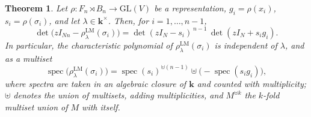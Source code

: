 \documentclass[11pt]{article}
\newtheorem{theorem}{Theorem}[section]
\theoremstyle{definition}
\theoremstyle{remark}
\newcommand{\GL}{\mathrm{GL}}
\newcommand{\spec}{\operatorname{spec}}
\newcommand{\kk}{\boldsymbol{k}}
\newcommand{\rLMl}{\rho^{\mathrm{LM}}_{\lambda}}
\begin{document}
\begin{theorem}\label{thm:charpoly}
Let $\rho \colon F_n \rtimes B_n \to \GL(V)$ be a representation,
$g_i = \rho(x_i)$, $s_i = \rho(\sigma_i)$, and let
$\lambda \in \kk^{\times}$. Then, for $i = 1, \dots, n-1$,
\begin{equation}\label{eq:charpoly}
\det\bigl(z I_{Nn} - \rLMl(\sigma_i)\bigr)
= \det(z I_N - s_i)^{\,n-1}\,\det(z I_N + s_i g_i).
\end{equation}
In particular, the characteristic polynomial of $\rLMl(\sigma_i)$ is
independent of $\lambda$, and as a multiset
\begin{equation}\label{eq:multiset}
\spec\bigl(\rLMl(\sigma_i)\bigr)
= \spec(s_i)^{\uplus (n-1)} \uplus
\bigl(-\spec(s_i g_i)\bigr),
\end{equation}
where spectra are taken in an algebraic closure of $\kk$ and counted with
multiplicity; $\uplus$ denotes the union of multisets, adding
multiplicities, and $M^{\uplus k}$ the $k$-fold multiset union of $M$
with itself.
\end{theorem}
\end{document}
